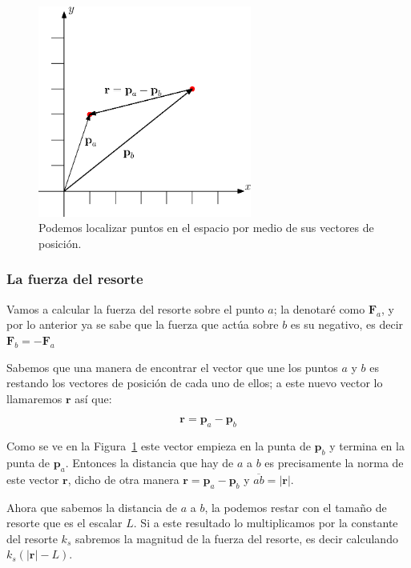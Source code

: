 \begin{figure}
 \centering
    \includegraphics[width=7cm]{img/01/vector_posicion}
 \caption[Ejemplo de vectores de posición]{ 
 Podemos localizar puntos en el espacio por medio de sus vectores de posición.
 } \label{posVec:fig}
\end{figure}

\subsubsection{La fuerza del resorte}

Vamos a calcular la fuerza del resorte sobre el punto $a$; la denotaré como $\textbf{F}_a$, y por lo anterior ya se sabe que la fuerza que actúa sobre $b$ es su negativo, es decir $\textbf{F}_b = -\textbf{F}_a$

Sabemos que una manera de encontrar el vector que une los puntos $a$ y $b$ es restando los vectores de posición de cada uno de ellos; a este nuevo vector lo llamaremos $\textbf{r}$ así que:

\begin{equation}
\textbf{r} = \textbf{p}_a - \textbf{p}_b
\end{equation}

Como se ve en la Figura~\ref{posVec:fig} este vector empieza en la punta de $\textbf{p}_b$ y termina en la punta de $\textbf{p}_a$.
Entonces la distancia que hay de $a$ a $b$ es precisamente la norma de este vector $\textbf{r}$, dicho de otra manera $\textbf{r} = \textbf{p}_a - \textbf{p}_b$ y $\overline{ab} = |\textbf{r}|$.

Ahora que sabemos la distancia de $a$ a $b$, la podemos restar con el tamaño de resorte que es el escalar $L$.
Si a este resultado lo multiplicamos por la constante del resorte $k_s$ sabremos la magnitud de la fuerza del resorte, es decir calculando $k_s \left( |\textbf{r}| - L \right)$.

